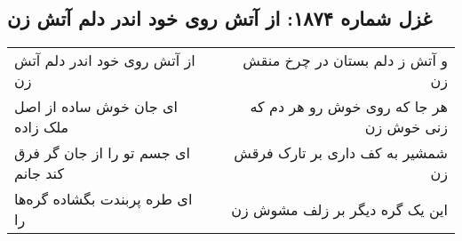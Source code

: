 \begin{center}
\section*{غزل شماره ۱۸۷۴: از آتش روی خود اندر دلم آتش زن}
\label{sec:1874}
\begin{longtable}{l p{0.5cm} r}
از آتش روی خود اندر دلم آتش زن
&&
و آتش ز دلم بستان در چرخ منقش زن
\\
ای جان خوش ساده از اصل ملک زاده
&&
هر جا که روی خوش رو هر دم که زنی خوش زن
\\
ای جسم تو را از جان گر فرق کند جانم
&&
شمشیر به کف داری بر تارک فرقش زن
\\
ای طره پربندت بگشاده گره‌ها را
&&
این یک گره دیگر بر زلف مشوش زن
\\
\end{longtable}
\end{center}
